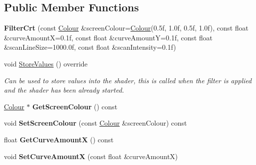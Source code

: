 \subsection*{Public Member Functions}
\begin{DoxyCompactItemize}
\item 
\mbox{\label{class_flounder_1_1_filter_crt_af20d1821893d0fe78a245d4733c03753}} 
{\bfseries Filter\+Crt} (const \hyperlink{class_flounder_1_1_colour}{Colour} \&screen\+Colour=\hyperlink{class_flounder_1_1_colour}{Colour}(0.\+5f, 1.\+0f, 0.\+5f, 1.\+0f), const float \&curve\+Amount\+X=0.\+1f, const float \&curve\+Amount\+Y=0.\+1f, const float \&scan\+Line\+Size=1000.\+0f, const float \&scan\+Intensity=0.\+1f)
\item 
void \hyperlink{class_flounder_1_1_filter_crt_a79cb3ff1010f5292f0548c0d10ba1772}{Store\+Values} () override
\begin{DoxyCompactList}\small\item\em Can be used to store values into the shader, this is called when the filter is applied and the shader has been already started. \end{DoxyCompactList}\item 
\mbox{\label{class_flounder_1_1_filter_crt_adf5a0b609815501aea06ec2ba14483ef}} 
\hyperlink{class_flounder_1_1_colour}{Colour} $\ast$ {\bfseries Get\+Screen\+Colour} () const
\item 
\mbox{\label{class_flounder_1_1_filter_crt_a595cc690599d9d3761ef51f39b2d1d53}} 
void {\bfseries Set\+Screen\+Colour} (const \hyperlink{class_flounder_1_1_colour}{Colour} \&screen\+Colour) const
\item 
\mbox{\label{class_flounder_1_1_filter_crt_aec85e524637fdc4074bf7305857ae73a}} 
float {\bfseries Get\+Curve\+AmountX} () const
\item 
\mbox{\label{class_flounder_1_1_filter_crt_a22d2a696c64af602a6594ef5e6ceebdf}} 
void {\bfseries Set\+Curve\+AmountX} (const float \&curve\+AmountX)
\item 
\mbox{\label{class_flounder_1_1_filter_crt_afa881a14e6a8a60f019ea4241c997648}} 

\end{DoxyCompactItemize}
